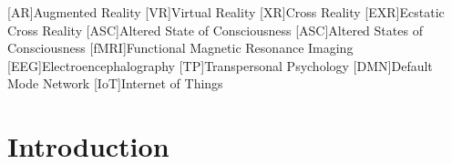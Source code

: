 \documentclass{UIdahoMastersThesis}
\begin{document}
\begin{acronym}[fMRI]  %
	[{\textup{AR}}]{Augmented Reality}
	[{\textup{VR}}]{Virtual Reality}
	[{\textup{XR}}]{Cross Reality}
	[{\textup{EXR}}]{Ecstatic Cross Reality}
	[{\textup{ASC}}]{Altered State of Consciousness}
	[{\textup{ASC}}]{Altered States of Consciousness}
	[{\textup{fMRI}}]{Functional Magnetic Resonance Imaging}
	[{\textup{EEG}}]{Electroencephalography}
	[{\textup{TP}}]{Transpersonal Psychology}
	[{\textup{DMN}}]{Default Mode Network}
	[{\textup{IoT}}]{Internet of Things}
	
\end{acronym}



\mainmatter  %
\setcounter{secnumdepth}{1}  %




\clearpage
\chapter{Introduction}
\label{Chapter:Introduction}

\acresetall  %
\end{document}
